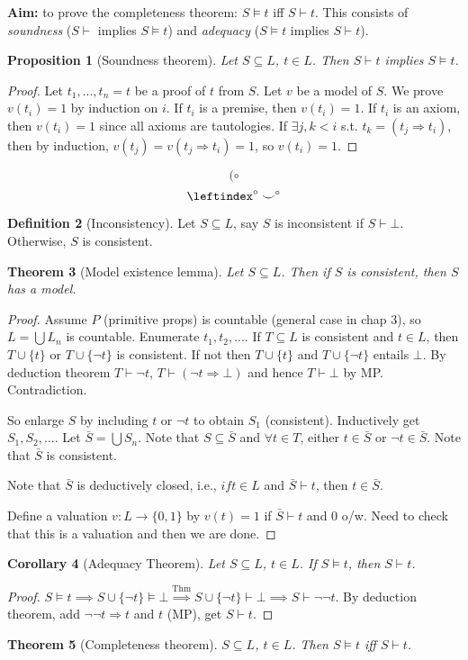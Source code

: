 \documentclass{article}
\theoremstyle{definition}
\newtheorem{defn}{Definition}[section]
\theoremstyle{remark}
\theoremstyle{plain}
\newtheorem{thm}[defn]{Theorem}
\newtheorem{prop}[defn]{Proposition}
\newtheorem{crly}[defn]{Corollary}
\begin{document}
\textbf{Aim:} to prove the completeness theorem: $S\vDash t$ iff $S\vdash t$. This consists of \textit{soundness} ($S\vdash$ implies $S\vDash t$) and \textit{adequacy} ($S\vDash t$ implies $S\vdash t$).
\begin{prop}[Soundness theorem]
    Let $S\subseteq L$, $t\in L$. Then $S\vdash t$ implies $S\vDash t$.
\end{prop}
\begin{proof}
    Let $t_1,...,t_n=t$ be a proof of $t$ from $S$. Let $v$ be a model of $S$. We prove $v(t_i)=1$ by induction on $i$. If $t_i$ is a premise, then $v(t_i)=1$. If $t_i$ is an axiom, then $v(t_i)=1$ since all axioms are tautologies. If $\exists j,k<i$ s.t. $t_k=(t_j\Rightarrow t_i)$, then by induction, $v(t_j)=v(t_j\Rightarrow t_i)=1$, so $v(t_i)=1$.
\end{proof}
\[(\circ\tag{Owen's cyclop signature}\]\[\leftindex^\circ\smile^\circ\]
\begin{defn}[Inconsistency]
    Let $S\subseteq L$, say $S$ is inconsistent if $S\vdash\bot$. Otherwise, $S$ is consistent.
\end{defn}
\begin{thm}[Model existence lemma]
    Let $S\subseteq L$. Then if $S$ is consistent, then $S$ has a model.
\end{thm}
\begin{proof}
    Assume $P$ (primitive props) is countable (general case in chap 3), so $L=\bigcup L_n$ is countable. Enumerate $t_1,t_2,...$. If $T\subseteq L$ is consistent and $t\in L$, then $T\cup\{t\}$ or $T\cup\{\neg t\}$ is consistent. If not then $T\cup\{t\}$ and $T\cup\{\neg t\}$ entails $\bot$. By deduction theorem $T\vdash\neg t$, $T\vdash(\neg t\Rightarrow\bot)$ and hence $T\vdash \bot$ by MP. Contradiction. 

    So enlarge $S$ by including $t$ or $\neg t$ to obtain $S_1$ (consistent). Inductively get $S_1, S_2,...$. Let $\bar S=\bigcup S_n$. Note that $S\subseteq\bar S$  and $\forall t\in T$, either $t\in\bar S$ or $\neg t\in \bar S$. Note that $\bar S$ is consistent.

    Note that $\bar S$ is deductively closed, i.e., $if t\in L$ and $\bar S\vdash t$, then $t\in\bar S$.

    Define a valuation $v:L\to\{0,1\}$ by $v(t)=1$ if $\bar S\vdash t$ and $0$ o/w. Need to check that this is a valuation and then we are done.
\end{proof}
\begin{crly}[Adequacy Theorem]
    Let $S\subseteq L$, $t\in L$. If $S\vDash t$, then $S\vdash t$.
\end{crly}    
\begin{proof}
    $S\vDash t\implies S\cup\{\neg t\}\vDash \bot\overset{\text{Thm}}{\implies} S\cup\{\neg t\}\vdash\bot\implies S\vdash\neg\neg t$. By deduction theorem, add $\neg\neg t\Rightarrow t$ and $t$ (MP), get $S\vdash t$.
\end{proof}
\begin{thm}[Completeness theorem]
    $S\subseteq L$, $t\in L$. Then $S\vDash t$ iff $S\vdash t$.
\end{thm}
\end{document}
